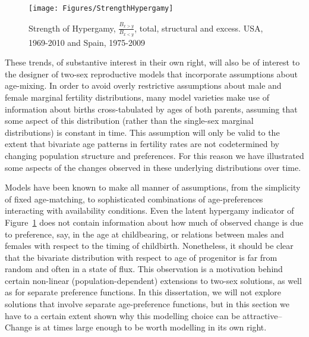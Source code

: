 \begin{figure}[!ht]
  \centering
    \caption{Strength of Hypergamy, $\frac{B_{x>y}}{B_{x<y}}$, total, structural
    and excess. USA, 1969-2010 and Spain, 1975-2009}
    \texttt{[image: Figures/StrengthHypergamy]}      
    \label{fig:HypergamyStrength}
\end{figure}

These trends, of substantive interest in their own right, will also be of
interest to the designer of two-sex reproductive models that incorporate
 assumptions about age-mixing. In order to avoid overly restrictive
 assumptions about male and female marginal fertility distributions, many
 model varieties make use of information about births cross-tabulated by
 ages of both parents, assuming that some aspect of this distribution
 (rather than the single-sex marginal distributions) is constant in time.
 This assumption will only be valid to the extent that bivariate age patterns in
 fertility rates are not codetermined by changing population structure and
 preferences. For this reason we have illustrated some aspects of the changes 
 observed in these underlying distributions over time. 
 
Models have been
 known to make all manner of assumptions, from the simplicity of 
 fixed age-matching, to sophisticated combinations of age-preferences 
 interacting with availability conditions. Even the latent hypergamy 
 indicator of Figure~\ref{fig:HypergamyStrength} does not contain information 
 about how much of observed change is due to preference, say, in the age at 
 childbearing, or relations between males and females with respect to the timing 
 of childbirth. Nonetheless, it should be clear that the bivariate distribution
with respect to age of progenitor is far from random and often in a state of
flux. This observation is a motivation behind certain non-linear
(population-dependent) extensions to two-sex solutions, as well as for separate
preference functions. In this dissertation, we will not explore solutions that
involve separate age-preference functions, but in this section we have to a
certain extent shown why this modelling choice can be attractive-- Change is at
times large enough to be worth modelling in its own right.
